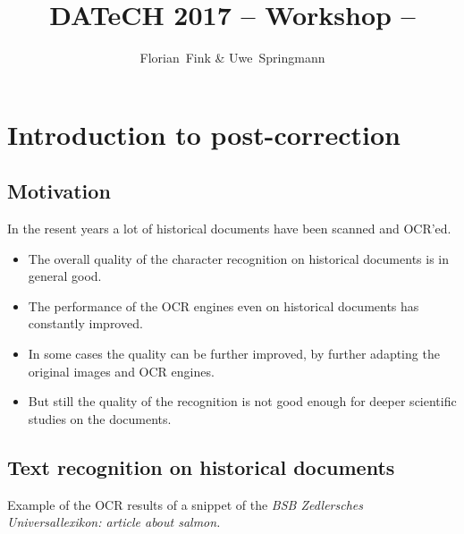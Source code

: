 
\title{DATeCH 2017 -- \pocoto{} Workshop -- \pocoto{}}
\author{Florian~Fink \& Uwe~Springmann}



\begin{frame}
	\titlepage
\end{frame}

\section{Introduction to post-correction}
\subsection{Motivation}
\begin{frame}
	In the resent years a lot of historical documents have been
	scanned and OCR'ed.

	\begin{itemize}
		\item The overall quality of the character recognition on historical
			documents is in general good.
		\item The performance of the OCR engines even on historical documents has
			constantly improved.
		\item In some cases the quality can be further improved, by further
			adapting the original images and OCR engines.
		\item But still the quality of the recognition is not good enough for
			deeper scientific studies on the documents.
	\end{itemize}
\end{frame}


\subsection{Text recognition on historical documents}
\begin{frame}
	Example of the OCR results of a snippet of the \emph{BSB Zedlersches
	Universallexikon: article about salmon.}
\end{frame}

